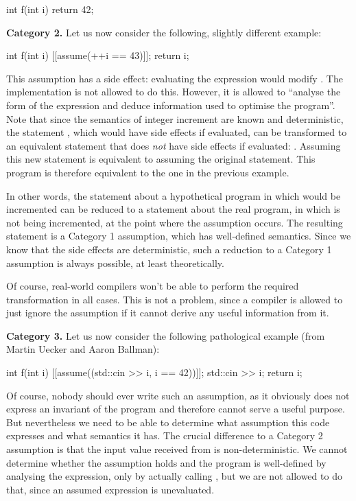 \begin{codeblock}
int f(int i) {
  return 42;
}
\end{codeblock}

\textbf{Category 2.} Let us now consider the following, slightly different example:

\begin{codeblock}
int f(int i) {
  [[assume(++i == 43)]];
  return i;
}
\end{codeblock}

This assumption has a side effect: evaluating the expression would modify . The implementation is not allowed to do this. However, it is allowed to ``analyse the form of the expression and deduce information used to optimise the program''. Note that since the semantics of integer increment are known and deterministic, the statement , which would have side effects if evaluated, can be transformed to an equivalent statement that does \emph{not} have side effects if evaluated: . Assuming this new statement is equivalent to assuming the original statement. This program is therefore equivalent to the one in the previous example.

In other words, the statement about a hypothetical program in which  would be incremented can be reduced to a statement about the real program, in which  is not being incremented, at the point where the assumption occurs. The resulting statement is a Category 1 assumption, which has well-defined semantics. Since we know that the side effects are deterministic, such a reduction to a Category 1 assumption is always possible, at least theoretically.

Of course, real-world compilers won't be able to perform the required transformation in all cases. This is not a problem, since a compiler is allowed to just ignore the assumption if it cannot derive any useful information from it.

\textbf{Category 3.} Let us now consider the following pathological example (from Martin Uecker and Aaron Ballman):

\begin{codeblock}
int f(int i) {
  [[assume((std::cin >> i, i == 42))]];
  std::cin >> i;
  return i;
}
\end{codeblock}

Of course, nobody should ever write such an assumption, as it obviously does not express an invariant of the program and therefore cannot serve a useful purpose. But nevertheless we need to be able to determine what assumption this code expresses and what semantics it has. The crucial difference to a Category 2 assumption is that the input value received from  is non-deterministic. We cannot determine whether the assumption holds and the program is well-defined by analysing the expression, only by actually calling , but we are not allowed to do that, since an assumed expression is unevaluated.

